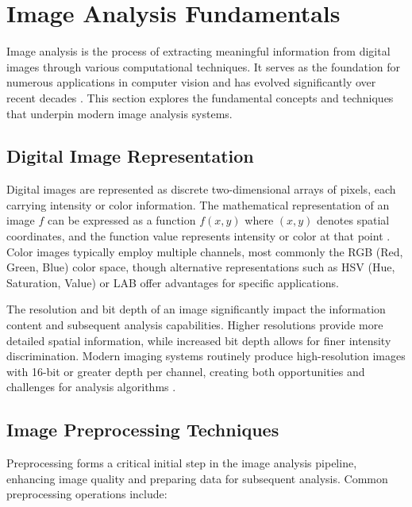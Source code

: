 \section{Image Analysis Fundamentals}
Image analysis is the process of extracting meaningful information from digital images through various computational techniques. It serves as the foundation for numerous applications in computer vision and has evolved significantly over recent decades \cite{gonzalez2018digital}. This section explores the fundamental concepts and techniques that underpin modern image analysis systems.

\subsection{Digital Image Representation}
Digital images are represented as discrete two-dimensional arrays of pixels, each carrying intensity or color information. The mathematical representation of an image $f$ can be expressed as a function $f(x,y)$ where $(x,y)$ denotes spatial coordinates, and the function value represents intensity or color at that point \cite{jain1989fundamentals}. Color images typically employ multiple channels, most commonly the RGB (Red, Green, Blue) color space, though alternative representations such as HSV (Hue, Saturation, Value) or LAB offer advantages for specific applications.

The resolution and bit depth of an image significantly impact the information content and subsequent analysis capabilities. Higher resolutions provide more detailed spatial information, while increased bit depth allows for finer intensity discrimination. Modern imaging systems routinely produce high-resolution images with 16-bit or greater depth per channel, creating both opportunities and challenges for analysis algorithms \cite{solomon2011fundamentals}.

\subsection{Image Preprocessing Techniques}
Preprocessing forms a critical initial step in the image analysis pipeline, enhancing image quality and preparing data for subsequent analysis. Common preprocessing operations include:

